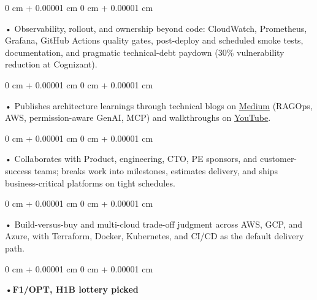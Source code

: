 \documentclass[10pt, letterpaper]{article}
\newenvironment{onecolentry}{
    \begin{adjustwidth}{
        0 cm + 0.00001 cm
    }{
        0 cm + 0.00001 cm
    }
}{
    \end{adjustwidth}
} %
\begin{document}
        \begin{onecolentry}
            • Observability, rollout, and ownership beyond code: CloudWatch, Prometheus, Grafana, GitHub Actions quality gates, post-deploy and scheduled smoke tests, documentation, and pragmatic technical-debt paydown (30\% vulnerability reduction at Cognizant).
        \end{onecolentry}
        \begin{onecolentry}
            • Publishes architecture learnings through technical blogs on \href{https://medium.com/@sreenikethaathreya}{Medium} (RAGOps, AWS, permission-aware GenAI, MCP) and walkthroughs on \href{https://www.youtube.com/@sreenikethaathreya7555}{YouTube}.
        \end{onecolentry}
        \begin{onecolentry}
            • Collaborates with Product, engineering, CTO, PE sponsors, and customer-success teams; breaks work into milestones, estimates delivery, and ships business-critical platforms on tight schedules.
        \end{onecolentry}
        \begin{onecolentry}
            • Build-versus-buy and multi-cloud trade-off judgment across AWS, GCP, and Azure, with Terraform, Docker, Kubernetes, and CI/CD as the default delivery path.
        \end{onecolentry}
        \begin{onecolentry}
                \textbf{•F1/OPT, H1B lottery picked}
        \end{onecolentry}

    \vspace{2 pt }
\end{document}
